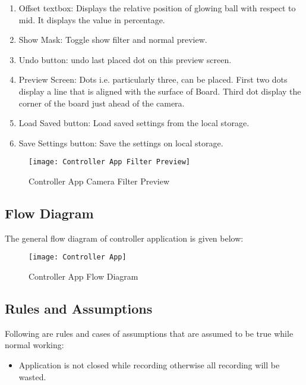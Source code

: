 \begin{enumerate}

\item Offset textbox: Displays the relative position of glowing ball with respect to mid. It displays the value in percentage.
\item Show Mask: Toggle show filter and normal preview.
\item Undo button: undo last placed dot on this preview screen.
\item Preview Screen: Dots i.e. particularly three, can be placed. First two dots display a line that is aligned with the surface of Board. Third dot display the corner of the board just ahead of the camera.
\item Load Saved button: Load saved settings from the local storage.
\item Save Settings button: Save the settings on local storage.

\end{enumerate}

\begin{figure}[h]
  \centering
  \texttt{[image: Controller App Filter Preview]}
  \caption{Controller App Camera Filter Preview}
\end{figure}

\subsection{Flow Diagram}

The general flow diagram of controller application is given below:
\newpage
\begin{figure}[h]
  \centering
  \texttt{[image: Controller App]}
  \caption{Controller App Flow Diagram}
\end{figure}

\subsection{Rules and Assumptions}
Following are rules and cases of assumptions that are assumed to be true while normal working:

\begin{itemize}

\item Application is not closed while recording otherwise all recording will be wasted.

\end{itemize}

